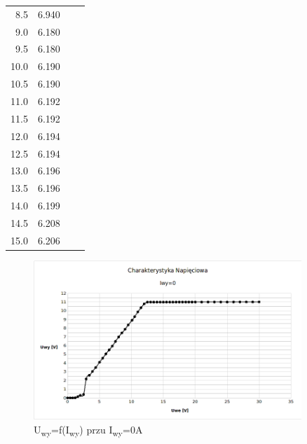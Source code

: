 \documentclass[a4paper,12pt]{article}
\begin{document}
\begin{table}[ht]
\begin{tabular}{|r|r|r|r|r|r|r|}
    8.5		& 6.940	&	& \multicolumn{4}{c|}{} \\ \cline{1-2} 
    9.0		& 6.180 &	& \multicolumn{4}{c|}{} \\ \cline{1-2} 
    9.5		& 6.180	&	& \multicolumn{4}{c|}{} \\ \cline{1-2} 
    10.0	& 6.190 &	& \multicolumn{4}{c|}{} \\ \cline{1-2} 
    10.5	& 6.190	&	& \multicolumn{4}{c|}{} \\ \cline{1-2} 
    11.0	& 6.192 &	& \multicolumn{4}{c|}{} \\ \cline{1-2} 
    11.5	& 6.192 &	& \multicolumn{4}{c|}{} \\ \cline{1-2} 
    12.0	& 6.194 &	& \multicolumn{4}{c|}{} \\ \cline{1-2} 
    12.5	& 6.194 &	& \multicolumn{4}{c|}{} \\ \cline{1-2} 
    13.0	& 6.196 &	& \multicolumn{4}{c|}{} \\ \cline{1-2} 
    13.5	& 6.196 &	& \multicolumn{4}{c|}{} \\ \cline{1-2} 
    14.0	& 6.199 &	& \multicolumn{4}{c|}{} \\ \cline{1-2} 
    14.5	& 6.208 &	& \multicolumn{4}{c|}{} \\ \cline{1-2} 
    15.0	& 6.206 &	& \multicolumn{4}{c|}{} \\ \hline
  \end{tabular}
\end{table}

\begin{figure}[h!]
  \center
  \includegraphics[width=0.90\textwidth]{charak-napieciowa1}
  \caption{U\textsubscript{wy}=f(I\textsubscript{wy}) przu I\textsubscript{wy}=0A}
\end{figure}
\end{document}
